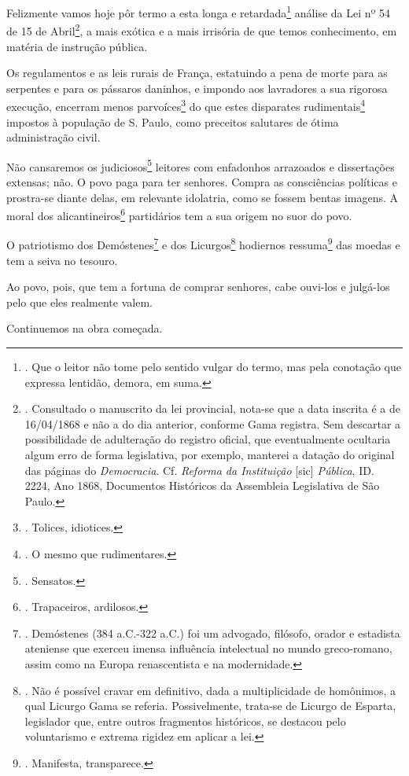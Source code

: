 Felizmente vamos hoje pôr termo a esta longa e retardada\footnote{. Que
  o leitor não tome pelo sentido vulgar do termo, mas pela conotação que
  expressa lentidão, demora, em suma.} análise da Lei nº 54 de 15 de
Abril\footnote{. Consultado o manuscrito da lei provincial, nota-se que
  a data inscrita é a de 16/04/1868 e não a do dia anterior, conforme
  Gama registra. Sem descartar a possibilidade de adulteração do
  registro oficial, que eventualmente ocultaria algum erro de forma
  legislativa, por exemplo, manterei a datação do original das páginas
  do \emph{Democracia}. Cf. \emph{Reforma da Instituição} {[}sic{]}
  \emph{Pública}, ID. 2224, Ano 1868, Documentos Históricos da
  Assembleia Legislativa de São Paulo.}, a mais exótica e a mais
irrisória de que temos conhecimento, em matéria de instrução pública.

Os regulamentos e as leis rurais de França, estatuindo a pena de morte
para as serpentes e para os pássaros daninhos, e impondo aos lavradores
a sua rigorosa execução, encerram menos parvoíces\footnote{. Tolices,
  idiotices.} do que estes disparates rudimentais\footnote{. O mesmo que
  rudimentares.} impostos à população de S. Paulo, como preceitos
salutares de ótima administração civil.

Não cansaremos os judiciosos\footnote{. Sensatos.} leitores com
enfadonhos arrazoados e dissertações extensas; não. O povo paga para ter
senhores. Compra as consciências políticas e prostra-se diante delas, em
relevante idolatria, como se fossem bentas imagens. A moral dos
alicantineiros\footnote{. Trapaceiros, ardilosos.} partidários tem a sua
origem no suor do povo.

O patriotismo dos Demóstenes\footnote{. Demóstenes (384 a.C.-322 a.C.)
  foi um advogado, filósofo, orador e estadista ateniense que exerceu
  imensa influência intelectual no mundo greco-romano, assim como na
  Europa renascentista e na modernidade.} e dos Licurgos\footnote{. Não
  é possível cravar em definitivo, dada a multiplicidade de homônimos, a
  qual Licurgo Gama se referia. Possivelmente, trata-se de Licurgo de
  Esparta, legislador que, entre outros fragmentos históricos, se
  destacou pelo voluntarismo e extrema rigidez em aplicar a lei.}
hodiernos ressuma\footnote{. Manifesta, transparece.} das moedas e tem a
seiva no tesouro.

Ao povo, pois, que tem a fortuna de comprar senhores, cabe ouvi-los e
julgá-los pelo que eles realmente valem.

Continuemos na obra começada.

